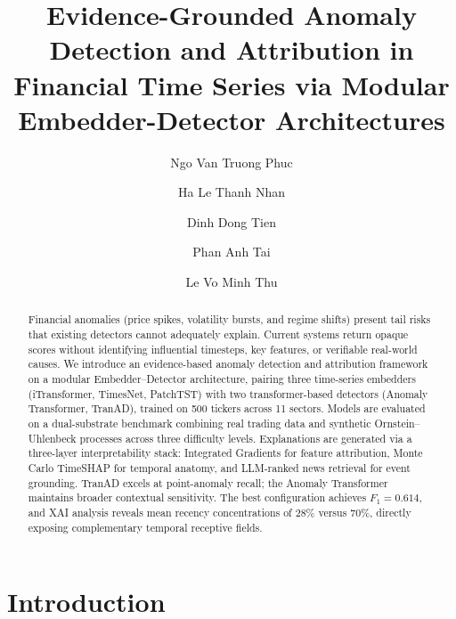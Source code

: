 \documentclass{llncs}
\begin{document}
\title{Evidence-Grounded Anomaly Detection and Attribution in Financial Time Series via Modular Embedder-Detector Architectures}

\author{Ngo Van Truong Phuc \and Ha Le Thanh Nhan \and Dinh Dong Tien \and Phan Anh Tai \and Le Vo Minh Thu}


\maketitle

\begin{abstract}
Financial anomalies (price spikes, volatility bursts, and regime shifts) present tail risks that existing detectors cannot adequately explain. Current systems return opaque scores without identifying influential timesteps, key features, or verifiable real-world causes. We introduce an evidence-based anomaly detection and attribution framework on a modular Embedder--Detector architecture, pairing three time-series embedders (iTransformer, TimesNet, PatchTST) with two transformer-based detectors (Anomaly Transformer, TranAD), trained on 500 tickers across 11 sectors. Models are evaluated on a dual-substrate benchmark combining real trading data and synthetic Ornstein--Uhlenbeck processes across three difficulty levels. Explanations are generated via a three-layer interpretability stack: Integrated Gradients for feature attribution, Monte Carlo TimeSHAP for temporal anatomy, and LLM-ranked news retrieval for event grounding. TranAD excels at point-anomaly recall; the Anomaly Transformer maintains broader contextual sensitivity. The best configuration achieves $F_1 = 0.614$, and XAI analysis reveals mean recency concentrations of 28\% versus 70\%, directly exposing complementary temporal receptive fields.
\end{abstract}

\section{Introduction}
\end{document}

